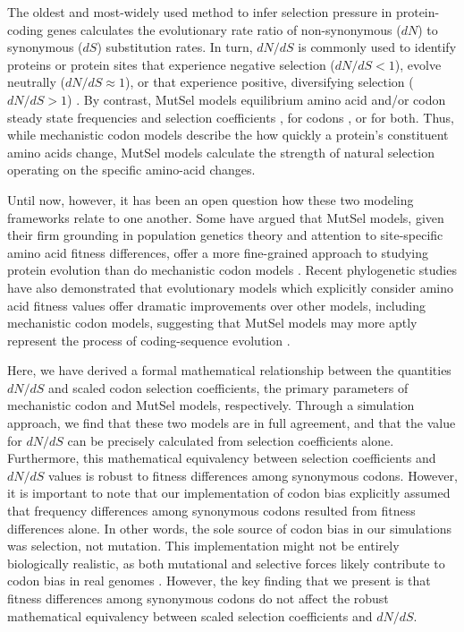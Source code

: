 \documentclass[11pt]{article}
\begin{document}
The oldest and most-widely used method to infer selection pressure in protein-coding genes calculates the evolutionary rate ratio of non-synonymous ($dN$) to synonymous ($dS$) substitution rates. In turn, $dN/dS$ is commonly used to identify proteins or protein sites that experience negative selection ($dN/dS<1$), evolve neutrally ($dN/dS\approx1$), or that experience positive, diversifying selection ($dN/dS>1$) \cite{NielsenYang1998,Yangetal2000, KosakovskyPondFrost2005}. By contrast, MutSel models equilibrium amino acid and/or codon steady state frequencies and selection coefficients \cite{HalpernBruno1998,NielsenYang2008,Rodrigueetal2010,Tamurietal2012,Tamurietal2014}, for codons \cite{YangNielsen2008}, or for both. Thus, while mechanistic codon models describe the how quickly a protein's constituent amino acids change, MutSel models calculate the strength of natural selection operating on the specific amino-acid changes.  

Until now, however, it has been an open question how these two modeling frameworks relate to one another. Some have argued that MutSel models, given their firm grounding in population genetics theory and attention to site-specific amino acid fitness differences, offer a more fine-grained approach to studying protein evolution than do mechanistic codon models \cite{HalpernBruno1998,Rodrigueetal2010}. Recent phylogenetic studies have also demonstrated that evolutionary models which explicitly consider amino acid fitness values offer dramatic improvements over other models, including mechanistic codon models, suggesting that MutSel models may more aptly represent the process of coding-sequence evolution \cite{Bloom2014a, Bloom2014b}. 

Here, we have derived a formal mathematical relationship between the quantities $dN/dS$ and scaled codon selection coefficients, the primary parameters of mechanistic codon and MutSel models, respectively. Through a simulation approach, we find that these two models are in full agreement, and that the value for $dN/dS$ can be precisely calculated from selection coefficients alone. Furthermore, this mathematical equivalency between selection coefficients and $dN/dS$ values is robust to fitness differences among synonymous codons. However, it is important to note that our implementation of codon bias explicitly assumed that frequency differences among synonymous codons resulted from fitness differences alone. In other words, the sole source of codon bias in our simulations was selection, not mutation. This implementation might not be entirely biologically realistic, as both mutational and selective forces likely contribute to codon bias in real genomes \cite{Blumer1991, Duret2002, HershbergPetrov2008, PlotkinKudla2010}. However, the key finding that we present is that fitness differences among synonymous codons do not affect the robust mathematical equivalency between scaled selection coefficients and $dN/dS$. 
\end{document}
